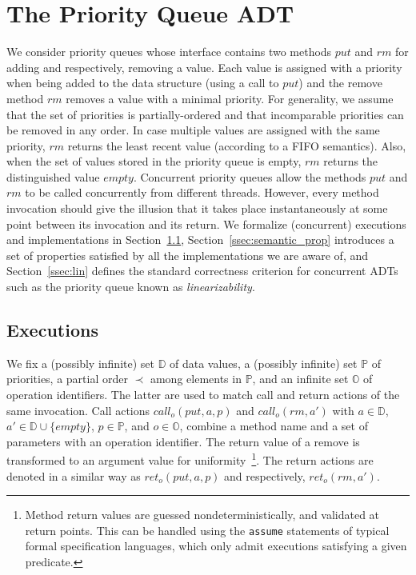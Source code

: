 \newcommand{\seqPQ}{\mathsf{SeqPQ}}

\section{The Priority Queue ADT}
\label{sec:priority queue and data-independence}

We consider priority queues whose interface contains two methods $\textit{put}$ and $\textit{rm}$ for adding and respectively, removing a value. Each value is assigned with a priority when being added to the data structure (using a call to  $\textit{put}$) and the remove method $\textit{rm}$ removes a value with a minimal priority. For generality, we assume that the set of priorities is partially-ordered and that incomparable priorities can be removed in any order. In case multiple values are assigned with the same priority, $\textit{rm}$ returns the least recent value (according to a FIFO semantics). Also, when the set of values stored in the priority queue is empty, $\textit{rm}$ returns the distinguished value $\textit{empty}$. Concurrent priority queues allow the methods $\textit{put}$ and $\textit{rm}$ to be called concurrently from different threads. However, every method invocation should give the illusion that it takes place instantaneously at some point between its invocation and its return. We formalize (concurrent) executions and implementations in Section~\ref{ssec:exec}, Section~\ref{ssec:semantic_prop} introduces a set of properties satisfied by all the  implementations we are aware of, and Section~\ref{ssec:lin} defines the standard correctness criterion for concurrent ADTs such as the priority queue known as \emph{linearizability}\cite{journals/toplas/HerlihyW90}.

\subsection{Executions}\label{ssec:exec}

We fix a (possibly infinite) set $\mathbb{D}$ of data values, a (possibly infinite) set $\mathbb{P}$ of priorities, a partial order $\prec$ among elements in $\mathbb{P}$, and an infinite set $\mathbb{O}$ of operation identifiers.
The latter are used to match call and return actions of the same invocation. Call actions $\textit{call}_o(\textit{put},a,p)$ and $\textit{call}_o(\textit{rm},a')$ with $a\in \mathbb{D}$, $a'\in \mathbb{D}\cup\{\textit{empty}\}$, $p \in \mathbb{P}$, and $o \in \mathbb{O}$, combine a method name and a set of parameters with an operation identifier. The return value of a remove is transformed to an argument value for uniformity~\footnote{Method return values are guessed nondeterministically, and validated at return points.
This can be handled using the {\tt assume} statements of typical formal specification languages, which only admit executions satisfying a given predicate.}.
The return actions are denoted in a similar way as $\textit{ret}_o(\textit{put},a,p)$ and respectively, $\textit{ret}_o(\textit{rm},a')$.


